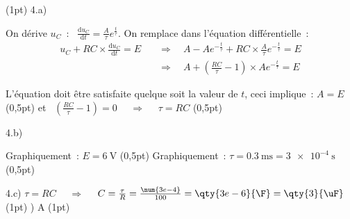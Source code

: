\begin{tcbitemize}
    \tcbitem (1pt)
    \tcbitem[raster multirow=4] 4.a)
    \tcbitem[raster multicolumn=2,raster multirow=2,blankest]
        \begin{tcbitemize}[raster rows=2,raster columns=2,
               raster height=\tcbtextheight,
               raster column 1/.style={width=\cwii},
               raster column 2/.style={width=\cwiii,fontupper=\bfseries}
            ]
            \tcbitem On dérive $u_{C}$~: \
                     $\frac{\mathrm{d}u_{C}}{\mathrm{d}t}=
                     \frac{A}{\tau}e^{\frac{t}{\tau}}$.
                     On remplace dans l'équation différentielle~:
                     \begin{align*}
                         u_{C}+RC\times\frac{\mathrm{d} u_{C}}{\mathrm{d} t}=E
                         &\quad\Rightarrow\quad
                         A-Ae^{-\frac{t}{\tau}}+
                         RC\times\frac{A}{\tau}e^{-\frac{t}{\tau}}=E \\
                         &\quad\Rightarrow\quad
                         A+\left(\frac{RC}{\tau}-1\right)\times
                         Ae^{-\frac{t}{\tau}}=E
                     \end{align*}

                     L'équation doit être satisfaite quelque soit la valeur de
                     $t$, ceci implique~: $A=E$ 
            \tcbitem (0,5pt)
            \tcbitem et \ $\left(\frac{RC}{\tau}-1\right)=0$
                     $\quad\Rightarrow\quad$ $\tau=RC$
            \tcbitem (0,5pt)
        \end{tcbitemize}
    \tcbitem[raster multirow=4] 4.b)
    \tcbitem[raster multicolumn=2,raster multirow=2,blankest]
        \begin{tcbitemize}[raster rows=2,raster columns=2,
               raster height=\tcbtextheight,
               raster column 1/.style={width=\cwii},
               raster column 2/.style={width=\cwiii,fontupper=\bfseries}
            ]
            \tcbitem Graphiquement~: $E=\qty{6}{\V}$
            \tcbitem (0,5pt)
            \tcbitem Graphiquement~: $\tau=\qty{0.3}{\ms}=\qty{3e-4}{\s}$
            \tcbitem (0,5pt)
        \end{tcbitemize}
    \tcbitem 4.c)
    \tcbitem $\tau=RC$ $\quad\Rightarrow\quad$
             $C=\frac{\tau}{R}=\frac{\num{3e-4}}{100}=\qty{3e-6}{\F}=
             \qty{3}{\uF}$
    \tcbitem (1pt)
    \tcbitem 5)
    \tcbitem A
    \tcbitem (1pt)
\end{tcbitemize}

